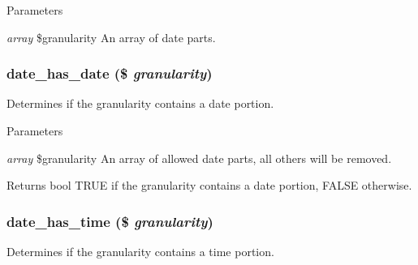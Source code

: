 \begin{DoxyParams}{Parameters}
\item[{\em array}]\$granularity An array of date parts. \end{DoxyParams}
\hypertarget{date__api_8module_adceab3322ab2c3d4375db8c974da9d7a}{
\subsubsection[{date\_\-has\_\-date}]{\setlength{\rightskip}{0pt plus 5cm}date\_\-has\_\-date (\$ {\em granularity})}}
\label{date__api_8module_adceab3322ab2c3d4375db8c974da9d7a}
Determines if the granularity contains a date portion.


\begin{DoxyParams}{Parameters}
\item[{\em array}]\$granularity An array of allowed date parts, all others will be removed.\end{DoxyParams}
\begin{DoxyReturn}{Returns}
bool TRUE if the granularity contains a date portion, FALSE otherwise. 
\end{DoxyReturn}
\hypertarget{date__api_8module_a86cfd92e64a544b228e916cd1b192c59}{
\subsubsection[{date\_\-has\_\-time}]{\setlength{\rightskip}{0pt plus 5cm}date\_\-has\_\-time (\$ {\em granularity})}}
\label{date__api_8module_a86cfd92e64a544b228e916cd1b192c59}
Determines if the granularity contains a time portion.


